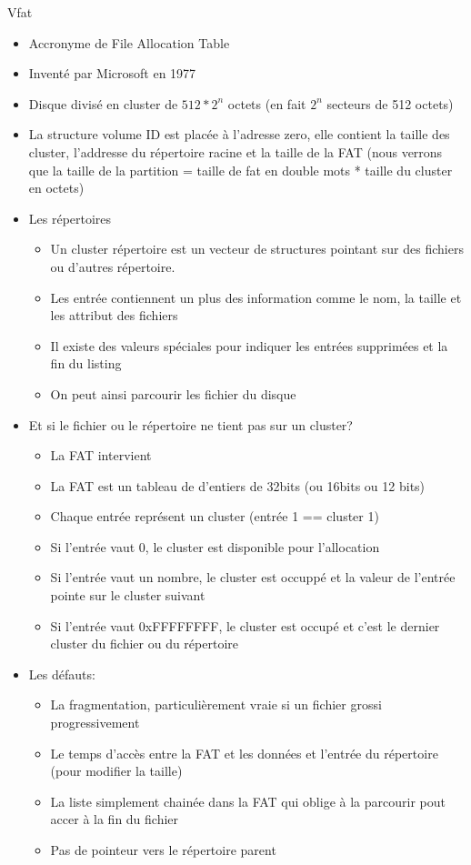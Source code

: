 \begin{frame}[fragile=singleslide]{Vfat}
  \begin{itemize}
  \item Accronyme de File Allocation Table
  \item Inventé par Microsoft en 1977
  \item Disque divisé en cluster de  $512 * 2^n$ octets (en fait $2^n$
    secteurs de 512 octets)
  \item  La structure  volume ID  est  placée à  l'adresse zero,  elle
    contient la taille des cluster, l'addresse du répertoire racine et
    la taille de la FAT (nous  verrons que la taille de la partition =
    taille de fat en double mots * taille du cluster en octets)
  \item Les répertoires
    \begin{itemize}
    \item Un cluster répertoire  est un vecteur de structures pointant
      sur des fichiers ou d'autres répertoire.
    \item Les entrée contiennent un plus des information comme le nom,
      la taille et les attribut des fichiers
    \item Il  existe des valeurs  spéciales pour indiquer  les entrées
      supprimées et la fin du listing
    \item On peut ainsi parcourir les fichier du disque
    \end{itemize}
  \item Et si le fichier ou le répertoire ne tient pas sur un cluster?
    \begin{itemize}
    \item La FAT intervient
    \item La FAT  est un tableau de d'entiers de  32bits (ou 16bits ou
      12 bits)
    \item Chaque entrée représent un cluster (entrée 1 == cluster 1)
    \item  Si  l'entrée  vaut   0,  le  cluster  est  disponible  pour
      l'allocation
    \item Si  l'entrée vaut  un nombre, le  cluster est occuppé  et la
      valeur de l'entrée pointe sur le cluster suivant
    \item Si l'entrée vaut 0xFFFFFFFF,  le cluster est occupé et c'est
      le dernier cluster du fichier ou du répertoire
    \end{itemize}
  \item Les défauts:
    \begin{itemize}
    \item  La  fragmentation,  particulièrement  vraie si  un  fichier
      grossi progressivement
    \item Le temps d'accès entre la  FAT et les données et l'entrée du
      répertoire (pour modifier la taille)
    \item  La liste simplement  chainée dans  la FAT  qui oblige  à la
      parcourir pout accer à la fin du fichier
    \item Pas de pointeur vers le répertoire parent
    \end{itemize}
  \end{itemize}
\end{frame}

